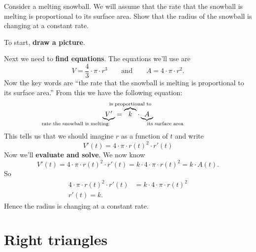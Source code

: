 \documentclass{ximera}
\begin{document}
\begin{example}
  Consider a melting snowball. We will assume that the rate that the
  snowball is melting is proportional to its surface area. Show that
  the radius of the snowball is changing at a constant rate.
  
\begin{explanation}
  To start, \textbf{draw a picture}.
  \begin{image}
  \end{image}
  Next we need to \textbf{find equations}. The equations we'll use are
  \[
  V = \frac{4}{3}\cdot \pi \cdot r^3 \qquad\text{and}\qquad A = 4\cdot
  \pi \cdot r^2.
  \]
  Now the key words are ``the rate that the snowball is melting is
  proportional to its surface area.'' From this we have the following
  equation:
  \[
  \underbrace{V'}_{\mathllap{\text{rate the snowball is melting}}} =
  \overbrace{k}^{\mathclap{\text{is proportional to}}}\cdot
  \underbrace{A}_{\mathrlap{\text{its surface area}}}
  \]
  This tells us that we should imagine $r$ as a function of $t$ and write
  \[
  V'(t) = 4\cdot \pi\cdot r(t)^2 \cdot r'(t)
  \]
  Now we'll \textbf{evaluate and solve}. We now know
  \[
  V'(t) = 4\cdot \pi \cdot r(t)^2 \cdot r'(t) =  k\cdot 4\cdot
  \pi \cdot r(t)^2 = k\cdot A(t).
  \]
  So
  \begin{align*}
  4\cdot \pi \cdot r(t)^2 \cdot r'(t) &=  k\cdot 4\cdot
  \pi \cdot r(t)^2\\
  r'(t) = k.
  \end{align*}
  Hence the radius is changing at a constant rate. 
\end{explanation}
\end{example}





\section{Right triangles}
\end{document}
